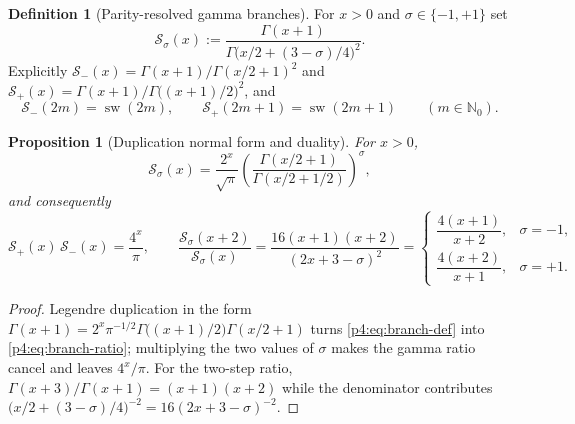 \documentclass[11pt,a4paper,oneside]{book}
\theoremstyle{plain}
\newtheorem{proposition}[theorem]{Proposition}
\theoremstyle{definition}
\newtheorem{definition}[theorem]{Definition}
\theoremstyle{remark}
\newcommand{\Nat}{\mathbb{N}}
\begin{document}
\begin{definition}[Parity-resolved gamma branches]
\label{p4:def:branches}
For $x>0$ and $\sigma\in\{-1,+1\}$ set
\begin{equation}
  \mathcal S_\sigma(x)
  :=\frac{\Gamma(x+1)}{\Gamma\!\bigl(x/2+(3-\sigma)/4\bigr)^{2}} .
  \label{p4:eq:branch-def}
\end{equation}
Explicitly $\mathcal S_-(x)=\Gamma(x+1)/\Gamma(x/2+1)^2$ and
$\mathcal S_+(x)=\Gamma(x+1)/\Gamma\bigl((x+1)/2\bigr)^2$, and
\begin{equation}
  \mathcal S_-(2m)=\operatorname{sw}(2m),
  \qquad
  \mathcal S_+(2m+1)=\operatorname{sw}(2m+1)
  \qquad(m\in\Nat_0).
  \label{p4:eq:branch-interpolates}
\end{equation}
\end{definition}

\begin{proposition}[Duplication normal form and duality]
\label{p4:prop:duplication}
For $x>0$,
\begin{equation}
  \mathcal S_\sigma(x)
  =\frac{2^{x}}{\sqrt\pi}
   \left(\frac{\Gamma(x/2+1)}{\Gamma(x/2+1/2)}\right)^{\!\sigma},
  \label{p4:eq:branch-ratio}
\end{equation}
and consequently
\begin{equation}
  \mathcal S_+(x)\,\mathcal S_-(x)=\frac{4^{x}}{\pi},
  \qquad
  \frac{\mathcal S_\sigma(x+2)}{\mathcal S_\sigma(x)}
  =\frac{16(x+1)(x+2)}{(2x+3-\sigma)^2}
  =\begin{cases}
     \dfrac{4(x+1)}{x+2},&\sigma=-1,\\[8pt]
     \dfrac{4(x+2)}{x+1},&\sigma=+1.
   \end{cases}
  \label{p4:eq:duality-and-step}
\end{equation}
\end{proposition}

\begin{proof}
Legendre duplication in the form
$\Gamma(x+1)=2^{x}\pi^{-1/2}\Gamma\bigl((x+1)/2\bigr)\Gamma(x/2+1)$ turns
\cref{p4:eq:branch-def} into \cref{p4:eq:branch-ratio}; multiplying the two
values of $\sigma$ makes the gamma ratio cancel and leaves $4^x/\pi$.  For the
two-step ratio, $\Gamma(x+3)/\Gamma(x+1)=(x+1)(x+2)$ while the denominator
contributes $\bigl(x/2+(3-\sigma)/4\bigr)^{-2}=16(2x+3-\sigma)^{-2}$.
\end{proof}
\end{document}
